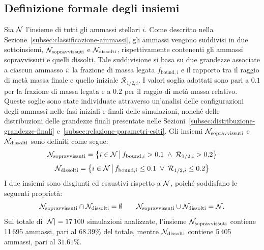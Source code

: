 \subsection{Definizione formale degli insiemi}
\label{subsec:criterio-vivi-morti}
Sia $\mathcal{N}$ l'insieme di tutti gli ammassi stellari $i$. Come descritto nella Sezione~\ref{subsec:classificazione-ammassi}, gli ammassi vengono suddivisi in due sottoinsiemi, $\mathcal{N}_{\mathrm{sopravvissuti}}$ e $\mathcal{N}_{\mathrm{dissolti}}$, rispettivamente contenenti gli ammassi sopravvissuti e quelli dissolti. Tale suddivisione si basa su due grandezze associate a ciascun ammasso $i$: la frazione di massa legata $f_{\mathrm{bound}, i}$ e il rapporto tra il raggio di metà massa finale e quello iniziale $\mathcal{R}_{1/2, i}$. I valori soglia adottati sono pari a $0.1$ per la frazione di massa legata e a $0.2$ per il raggio di metà massa relativo. Queste soglie sono state individuate attraverso un'analisi delle configurazioni degli ammassi nelle fasi iniziali e finali delle simulazioni, nonché delle distribuzioni delle grandezze finali presentate nelle Sezioni~\ref{subsec:distribuzione-grandezze-finali} e~\ref{subsec:relazione-parametri-esiti}.
Gli insiemi $\mathcal{N}_{\mathrm{sopravvissuti}}$ e $\mathcal{N}_{\mathrm{dissolti}}$ sono definiti come segue:
\[
\mathcal{N}_{\mathrm{sopravvissuti}} = \left\{ i \in \mathcal{N} \,\middle|\, f_{\mathrm{bound}, i} > 0.1 \;\land\; \mathcal{R}_{1/2, i} > 0.2 \right\}
\]
\[
\mathcal{N}_{\mathrm{dissolti}} = \left\{ i \in \mathcal{N} \,\middle|\, f_{\mathrm{bound}, i} \leq 0.1 \;\lor\; \mathcal{R}_{1/2, i} \leq 0.2 \right\}
\]
I due insiemi sono disgiunti ed esaustivi rispetto a $\mathcal{N}$, poiché soddisfano le seguenti proprietà:
\[
\mathcal{N}_{\mathrm{sopravvissuti}} \cap \mathcal{N}_{\mathrm{dissolti}} = \emptyset
\qquad
\mathcal{N}_{\mathrm{sopravvissuti}} \cup \mathcal{N}_{\mathrm{dissolti}} = \mathcal{N}.
\]
Sul totale di $|\mathcal{N}|=17\,100$ simulazioni analizzate, l'insieme $\mathcal{N}_{\mathrm{sopravvissuti}}$ contiene 11\,695 ammassi, pari al $68.39\%$ del totale, mentre $\mathcal{N}_{\mathrm{dissolti}}$ contiene 5\,405 ammassi, pari al $31.61\%$.
